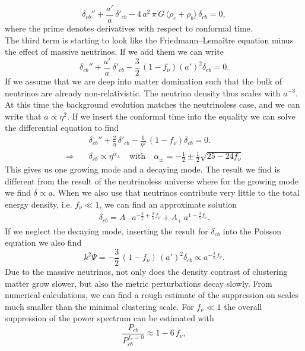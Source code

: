 \documentclass[../main.tex]{subfiles}
\begin{document}
\begin{equation}
    \delta_{cb}'' + \frac{a'}{a}\,\delta'_{cb} - 4\,a^2\,\pi\,G\,\langle \rho_c + \rho_b \rangle\, \delta_{cb} = 0,
\end{equation} 
where the prime denotes derivatives with respect to conformal time.\\
The third term is starting to look like the Friedmann–Lemaître equation minus the effect of massive neutrinos. If we add them we can write 
\begin{equation}
    \delta_{cb}'' + \frac{a'}{a}\,\delta'_{cb} - \frac{3}{2}\,(1-f_\nu)\left({a'}\right)^2 \delta_{cb} = 0.
\end{equation}
If we assume that we are deep into matter domination such that the bulk of neutrinos are already non-relativistic. The neutrino density thus scales with $a^{-3}$. At this time the background evolution matches the neutrinoless case, and we can write that $a\propto\eta^2$. If we insert the conformal time into the equality we can solve the differential equation to find \begin{align}
    &\delta_{cb}'' + \frac{2}{\eta}\,\delta'_{cb} - \frac{6}{\eta^2}\,(1-f_\nu) \delta_{cb} = 0.\\
    \Longrightarrow\quad&\delta_{cb} \propto \eta^{\alpha_\pm}\quad\text{with}\quad\alpha_\pm = -\frac{1}{2}\pm\frac{1}{2}\sqrt{25-24f_\nu}
\end{align}
This gives us one growing mode and a decaying mode. The result we find is different from the result of the neutrinoless universe where for the growing mode we find $\delta\propto a$. When we also use that neutrinos contribute very little to the total energy density, i.e. $f_\nu\ll 1$, we can find an approximate solution \begin{align}
    \delta_{cb} = A_-\,a^{-\frac{3}{2}+\frac{3}{5}\,f_\nu}+A_+\, a^{1-\frac{3}{5}f_\nu}.
\end{align}
If we neglect the decaying mode, inserting the result for $\delta_{cb}$ into the Poisson equation we also find 
\begin{equation}
k^2\Psi = -\frac{3}{2}\,(1-f_\nu)\,(a')^2\delta_{cb}\propto a^{-\frac{3}{5}\,f_\nu}.
\end{equation}
Due to the massive neutrinos, not only does the density contrast of clustering matter grow slower, but also the metric perturbations decay slowly. From numerical calculations, we can find a rough estimate of the suppression on scales much smaller than the minimal clustering scale. For $f_\nu\ll1$ the overall suppression of the power spectrum  can be estimated with \begin{equation}
    \frac{P_{cb}}{P_{cb}^{f_\nu=0}} \approx 1- 6\,f_\nu,
\end{equation} 
\end{document}
